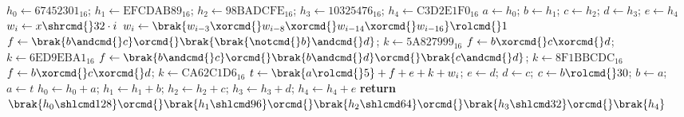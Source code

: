 \begin{algorithmic}[1]
\State $h_0\gets\textrm{67452301}_{16}$; $h_1\gets\textrm{EFCDAB89}_{16}$; $h_2\gets\textrm{98BADCFE}_{16}$; $h_3\gets\textrm{10325476}_{16}$; $h_4\gets\textrm{C3D2E1F0}_{16}$
\State $a\gets h_0$; $b\gets h_1$; $c\gets h_2$; $d\gets h_3$; $e\gets h_4$
\State $w_i\gets x\shrcmd{}32\cdot i$
\EndFor
{}
\State $w_i\gets\brak{w_{i-3}\xorcmd{}w_{i-8}\xorcmd{}w_{i-14}\xorcmd{}w_{i-16}}\rolcmd{}1$
\EndFor
{}
\State $f\gets \brak{b\andcmd{}c}\orcmd{}\brak{\brak{\notcmd{}b}\andcmd{}d}$; $k\gets\textrm{5A827999}_{16}$
\State $f\gets b\xorcmd{}c\xorcmd{}d$; $k\gets\textrm{6ED9EBA1}_{16}$
\State $f\gets \brak{b\andcmd{}c}\orcmd{}\brak{b\andcmd{}d}\orcmd{}\brak{c\andcmd{}d}$; $k\gets\textrm{8F1BBCDC}_{16}$
\State $f\gets b\xorcmd{}c\xorcmd{}d$; $k\gets\textrm{CA62C1D6}_{16}$
\EndIf
\State $t\gets \brak{a\rolcmd{}5}+f+e+k+w_i$; $e\gets d$; $d\gets c$; $c\gets b\rolcmd{}30$; $b\gets a$; $a\gets t$
\EndFor
\State $h_0\gets h_0+a$; $h_1\gets h_1+b$; $h_2\gets h_2+c$; $h_3\gets h_3+d$; $h_4\gets h_4+e$
\EndFor
\State \textbf{return} $\brak{h_0\shlcmd128}\orcmd{}\brak{h_1\shlcmd96}\orcmd{}\brak{h_2\shlcmd64}\orcmd{}\brak{h_3\shlcmd32}\orcmd{}\brak{h_4}$
\EndProcedure
\end{algorithmic}